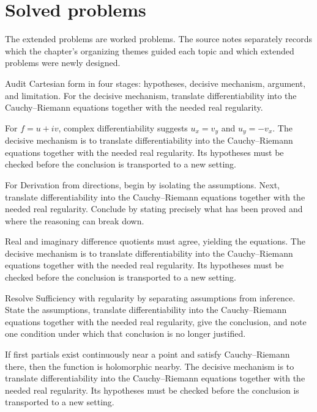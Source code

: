 \section{Solved problems}
The extended problems are worked problems. The source notes separately records which the chapter's organizing themes guided each topic and which extended problems were newly designed.

\begin{problem}\label{prob:iv02-problem-01}
Audit Cartesian form in four stages: hypotheses, decisive mechanism, argument, and limitation. For the decisive mechanism, translate differentiability into the Cauchy--Riemann equations together with the needed real regularity.
\end{problem}
\begin{solution}
For $f=u+iv$, complex differentiability suggests $u_x=v_y$ and $u_y=-v_x$. The decisive mechanism is to translate differentiability into the Cauchy--Riemann equations together with the needed real regularity. Its hypotheses must be checked before the conclusion is transported to a new setting.
\end{solution}

\begin{problem}\label{prob:iv02-problem-02}
For Derivation from directions, begin by isolating the assumptions. Next, translate differentiability into the Cauchy--Riemann equations together with the needed real regularity. Conclude by stating precisely what has been proved and where the reasoning can break down.
\end{problem}
\begin{solution}
Real and imaginary difference quotients must agree, yielding the equations. The decisive mechanism is to translate differentiability into the Cauchy--Riemann equations together with the needed real regularity. Its hypotheses must be checked before the conclusion is transported to a new setting.
\end{solution}

\begin{problem}\label{prob:iv02-problem-03}
Resolve Sufficiency with regularity by separating assumptions from inference. State the assumptions, translate differentiability into the Cauchy--Riemann equations together with the needed real regularity, give the conclusion, and note one condition under which that conclusion is no longer justified.
\end{problem}
\begin{solution}
If first partials exist continuously near a point and satisfy Cauchy–Riemann there, then the function is holomorphic nearby. The decisive mechanism is to translate differentiability into the Cauchy--Riemann equations together with the needed real regularity. Its hypotheses must be checked before the conclusion is transported to a new setting.
\end{solution}

